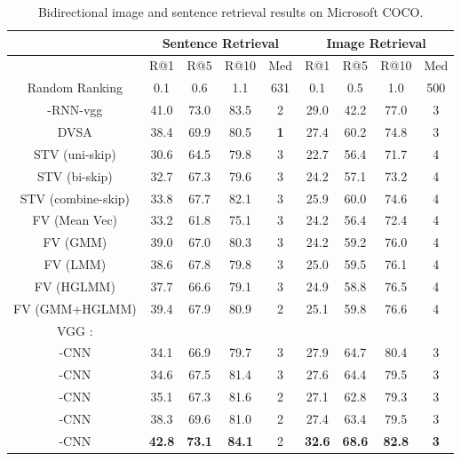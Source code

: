 \documentclass[10pt,twocolumn,letterpaper]{article}
\begin{document}
\begin{table*} \small
\begin{center}
\begin{tabular}{c|cccc|cccc}
    \hline
          & \multicolumn{4}{|c|}{Sentence Retrieval} & \multicolumn{4}{|c}{Image Retrieval}  \\
          \hline
          \hline
        & R@1 & R@5 & R@10 & Med  & R@1 & R@5 & R@10 & Med  \\
        \hline
        \hline
        Random Ranking & 0.1 & 0.6 & 1.1 & 631 & 0.1 & 0.5  & 1.0 & 500\\
        -RNN-vgg \cite{mao_iclr_2015}& 41.0 & 73.0 & 83.5 & 2 & 29.0 & 42.2  & 77.0 & 3\\
        DVSA\cite{karpathy_dvsa_2014}& 38.4 & 69.9 & 80.5 & \textbf{1} & 27.4 & 60.2  & 74.8 & 3\\


        STV (uni-skip) \cite{kiros_2015} & 30.6 & 64.5 & 79.8 & 3 & 22.7 & 56.4 & 71.7 & 4 \\
        STV (bi-skip) \cite{kiros_2015} & 32.7 & 67.3 & 79.6 & 3 & 24.2 & 57.1 & 73.2 & 4 \\
        STV (combine-skip) \cite{kiros_2015} & 33.8 & 67.7 & 82.1 & 3 & 25.9 & 60.0 & 74.6 & 4 \\

        FV (Mean Vec) \cite{klein_cvpr2015} & 33.2 & 61.8 & 75.1 & 3 & 24.2 & 56.4 & 72.4 & 4 \\
        FV (GMM) \cite{klein_cvpr2015} & 39.0 & 67.0 & 80.3 & 3& 24.2 & 59.2 & 76.0 & 4 \\
        FV (LMM) \cite{klein_cvpr2015} & 38.6 & 67.8 & 79.8 & 3 & 25.0 & 59.5 & 76.1 & 4 \\
        FV (HGLMM) \cite{klein_cvpr2015} & 37.7 & 66.6 & 79.1 & 3 & 24.9 & 58.8 & 76.5 & 4 \\
        FV (GMM+HGLMM) \cite{klein_cvpr2015} & 39.4 & 67.9 & 80.9 & 2 & 25.1 & 59.8 & 76.6 & 4 \\

        \hline
        \hline
        VGG \cite{simonyan_arxiv2014}:&&&&&&&& \\
        -CNN & 34.1 & 66.9 & 79.7 & 3 & 27.9 & 64.7 & 80.4 & 3\\
        -CNN& 34.6 & 67.5 & 81.4 & 3 & 27.6 & 64.4 & 79.5 & 3\\
        -CNN& 35.1 & 67.3 & 81.6 & 2 & 27.1 & 62.8 & 79.3 & 3\\
        -CNN & 38.3 & 69.6 & 81.0 & 2 & 27.4 & 63.4 & 79.5 & 3\\
        -CNN & \textbf{42.8} & \textbf{73.1} & \textbf{84.1} & {2} & \textbf{32.6} & \textbf{68.6} & \textbf{82.8} & \textbf{3}\\
        \hline
        \hline

    \end{tabular}


\end{center}
\caption{Bidirectional image and sentence retrieval results on Microsoft COCO.}\label{table:mscoco}
\end{table*}
\end{document}
